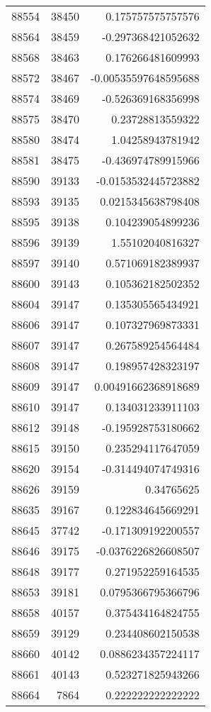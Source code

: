 \begin{tabular}{r | r | r}
88554 & 38450 & 0.175757575757576 \\
88564 & 38459 & -0.297368421052632 \\
88568 & 38463 & 0.176266481609993 \\
88572 & 38467 & -0.00535597648595688 \\
88574 & 38469 & -0.526369168356998 \\
88575 & 38470 & 0.23728813559322 \\
88580 & 38474 & 1.04258943781942 \\
88581 & 38475 & -0.436974789915966 \\
88590 & 39133 & -0.0153532445723882 \\
88593 & 39135 & 0.0215345638798408 \\
88595 & 39138 & 0.104239054899236 \\
88596 & 39139 & 1.55102040816327 \\
88597 & 39140 & 0.571069182389937 \\
88600 & 39143 & 0.105362182502352 \\
88604 & 39147 & 0.135305565434921 \\
88606 & 39147 & 0.107327969873331 \\
88607 & 39147 & 0.267589254564484 \\
88608 & 39147 & 0.198957428323197 \\
88609 & 39147 & 0.00491662368918689 \\
88610 & 39147 & 0.134031233911103 \\
88612 & 39148 & -0.195928753180662 \\
88615 & 39150 & 0.235294117647059 \\
88620 & 39154 & -0.314494074749316 \\
88626 & 39159 & 0.34765625 \\
88635 & 39167 & 0.122834645669291 \\
88645 & 37742 & -0.171309192200557 \\
88646 & 39175 & -0.0376226826608507 \\
88648 & 39177 & 0.271952259164535 \\
88653 & 39181 & 0.0795366795366796 \\
88658 & 40157 & 0.375434164824755 \\
88659 & 39129 & 0.234408602150538 \\
88660 & 40142 & 0.0886234357224117 \\
88661 & 40143 & 0.523271825943266 \\
88664 & 7864 & 0.222222222222222 \\

\end{tabular}
